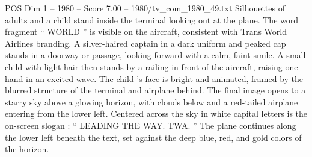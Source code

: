 \begin{textsample}{POS Dim 1 – 1980 – Score 7.00 – 1980/tv\_com\_1980\_49.txt}
Silhouettes of adults and a child stand inside the terminal looking out at the plane.
The word fragment “ WORLD ” is visible on the aircraft, consistent with Trans World Airlines branding.
A silver-haired captain in a dark uniform and peaked cap stands in a doorway or passage, looking forward with a calm, faint smile.
A small child with light hair then stands by a railing in front of the aircraft, raising one hand in an excited wave.
The child ’s face is bright and animated, framed by the blurred structure of the terminal and airplane behind.
The final image opens to a starry sky above a glowing horizon, with clouds below and a red-tailed airplane entering from the lower left.
Centered across the sky in white capital letters is the on-screen slogan : “ LEADING THE WAY.
TWA. ” The plane continues along the lower left beneath the text, set against the deep blue, red, and gold colors of the horizon.

\end{textsample}
